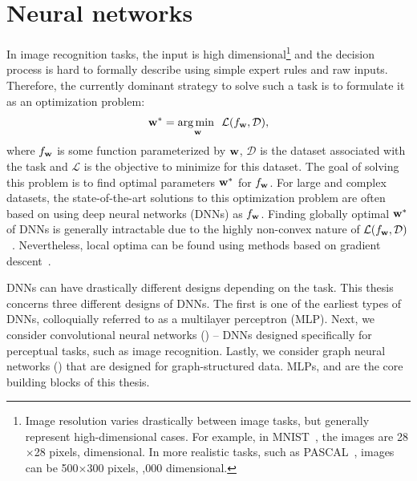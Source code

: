 \section{Neural networks\label{sec:bg_nn}}
In image recognition tasks,
the input is high dimensional\footnote{Image resolution varies drastically between image tasks, but generally represent high-dimensional cases. For example, in MNIST~\citep{lecun1998gradient}, the images are 28$\times$28 pixels,  dimensional. In more realistic tasks, such as PASCAL~\citep{everingham2010pascal}, images can be 500$\times$300 pixels, ,000 dimensional.} and the decision process is hard to formally describe using simple expert rules and raw inputs.
Therefore, the currently dominant strategy to solve such a task is to formulate it as an optimization problem:
%
\begin{equation}
    \mathbf{w}^* = \underset{\mathbf{w}}{\text{arg\,min }} \ \mathcal{L}(f_{\mathbf{w}}, \mathcal{D}),
\end{equation} 
%
\noindent where $f_{\mathbf{w}}$ is some function parameterized by $\mathbf{w}$, $\mathcal{D}$ is the dataset associated with the task and $\mathcal{L}$ is the objective to minimize for this dataset. The goal of solving this problem is to find optimal parameters $\mathbf{w}^*$ for $f_{\mathbf{w}}$.
For large and complex datasets, the state-of-the-art solutions to this optimization problem are often based on using deep neural networks (DNNs) as $f_{\mathbf{w}}$. Finding globally optimal $\mathbf{w}^*$ of DNNs is generally intractable due to the highly non-convex nature of $\mathcal{L}(f_{\mathbf{w}}, \mathcal{D})$~\citep{choromanska2015loss}. Nevertheless, local optima can be found using methods based on gradient descent~\citep{ruder2016overview,kingma2014adam}.

DNNs can have drastically different designs depending on the task. This thesis concerns three different designs of DNNs. The first is one of the earliest types of DNNs, colloquially referred to as a multilayer perceptron (MLP). Next, we consider convolutional neural networks (\cnns) -- DNNs designed specifically for perceptual tasks, such as image recognition. Lastly, we consider graph neural networks (\gnns) that are designed for graph-structured data. MLPs, \cnns and \gnns are the core building blocks of this thesis.

